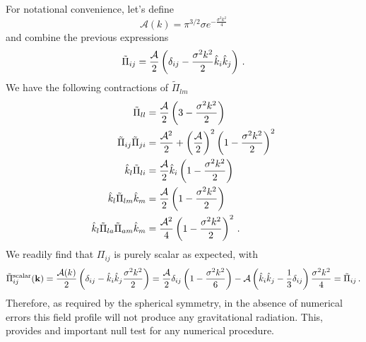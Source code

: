 \documentclass{revtex4}
\begin{document}
For notational convenience, let's define
\begin{equation}
  \mathcal{A}(k) = \pi^{3/2}\sigma e^{-\frac{\sigma^2k^2}{4}}
\end{equation}
and combine the previous expressions
\begin{equation}
  \tilde{\Pi}_{ij} = \frac{\mathcal{A}}{2}\left(\delta_{ij} - \frac{\sigma^2k^2}{2}\hat{k}_i\hat{k}_j\right) \, .
\end{equation}
We have the following contractions of $\tilde{\Pi}_{lm}$
\begin{subequations}
\begin{align}
  \tilde{\Pi}_{ll} &= \frac{\mathcal{A}}{2}\left(3-\frac{\sigma^2k^2}{2}\right) \\
  \tilde{\Pi}_{ij}\tilde{\Pi}_{ji} &= \frac{\mathcal{A}^2}{2} + \left(\frac{\mathcal{A}}{2}\right)^2\left(1-\frac{\sigma^2k^2}{2}\right)^2 \\
  \hat{k}_l\tilde{\Pi}_{li} &= \frac{\mathcal{A}}{2}\hat{k}_i\left(1-\frac{\sigma^2k^2}{2}\right) \\
  \hat{k}_l\tilde{\Pi}_{lm}\hat{k}_m &= \frac{\mathcal{A}}{2}\left(1-\frac{\sigma^2k^2}{2}\right) \\
  \hat{k}_l\tilde{\Pi}_{la}\tilde{\Pi}_{am}\hat{k}_m &= \frac{\mathcal{A}^2}{4}\left(1-\frac{\sigma^2k^2}{2}\right)^2 \, .
\end{align}
\end{subequations}
We readily find that $\Pi_{ij}$ is purely scalar as expected, with
\begin{equation}
  \tilde{\Pi}_{ij}^{{\rm scalar}}({\bf k})
  = \frac{\mathcal{A}(k)}{2}\left(\delta_{ij}-\hat{k}_i\hat{k}_j\frac{\sigma^2k^2}{2}\right)
  = \frac{\mathcal{A}}{2}\delta_{ij}\left(1-\frac{\sigma^2k^2}{6}\right) - \mathcal{A}\left(\hat{k}_i\hat{k}_j-\frac{1}{3}\delta_{ij}\right)\frac{\sigma^2 k^2}{4}
  = \tilde{\Pi}_{ij} \, .
\end{equation}
Therefore, as required by the spherical symmetry, in the absence of numerical errors this field profile will not produce any gravitational radiation.
This, provides and important null test for any numerical procedure.
\end{document}

